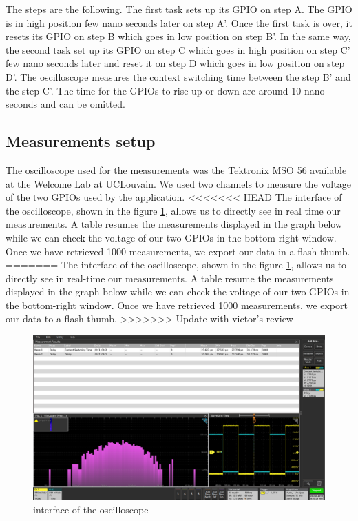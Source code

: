 The steps are the following.
The first task sets up its GPIO on step A.
The GPIO is in high position few nano seconds later on step A'.
Once the first task is over, it resets its GPIO on step B which goes in low position on step B'.
In the same way, the second task set up its GPIO on step C which goes in high position on step C' few nano seconds later and reset it on step D which goes in low position on step D'.
The oscilloscope measures the context switching time between the step B' and the step C'.
The time for the GPIOs to rise up or down are around 10 nano seconds and can be omitted.


\subsection{Measurements setup\label{sec:measurement-setup}}

The oscilloscope used for the measurements was the Tektronix MSO 56\cite{mso56} available at the Welcome Lab at UCLouvain.
We used two channels to measure the voltage of the two GPIOs used by the application.
<<<<<<< HEAD
The interface of the oscilloscope, shown in the figure \ref{fig:oscilloscope-interface}, allows us to directly see in real time our measurements.
A table resumes the measurements displayed in the graph below while we can check the voltage of our two GPIOs in the bottom-right window.
Once we have retrieved 1000 measurements, we export our data in a flash thumb.
=======
The interface of the oscilloscope, shown in the figure \ref{fig:oscilloscope-interface}, allows us to directly see in real-time our measurements.
A table resume the measurements displayed in the graph below while we can check the voltage of our two GPIOs in the bottom-right window.
Once we have retrieved 1000 measurements, we export our data to a flash thumb.
>>>>>>> Update with victor's review

\begin{figure}[!ht]
    \centering
    \includegraphics[scale=0.25]{assets/oscilloscope-interface.png}
    \caption{interface of the oscilloscope\label{fig:oscilloscope-interface}}
\end{figure}

